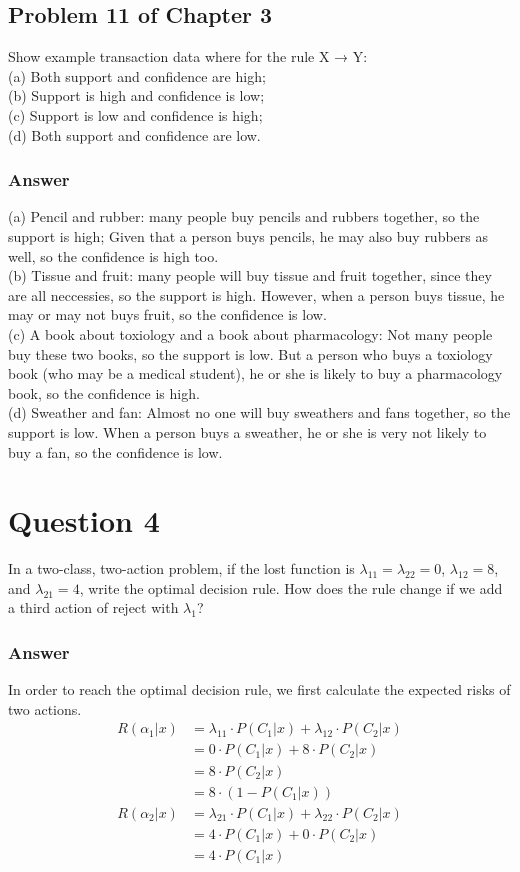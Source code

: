 \documentclass{article}
\begin{document}
\subsection*{Problem 11 of Chapter 3}
Show example transaction data where for the rule X → Y:\\
(a) Both support and confidence are high;\\
(b) Support is high and confidence is low;\\
(c) Support is low and confidence is high;\\ 
(d) Both support and confidence are low.
\subsubsection*{Answer}
(a) Pencil and rubber: many people buy pencils and rubbers together, so the support is high; Given that a person buys pencils, he may also buy rubbers as well, so the confidence is high too.\\
(b) Tissue and fruit: many people will buy tissue and fruit together, since they are all neccessies, so the support is high. However, when a person buys tissue, he may or may not buys fruit, so the confidence is low.\\
(c) A book about toxiology and a book about pharmacology: Not many people buy these two books, so the support is low. But a person who buys a toxiology book (who may be a medical student), he or she is likely to buy a pharmacology book, so the confidence is high. \\
(d) Sweather and fan: Almost no one will buy sweathers and fans together, so the support is low. When a person buys a sweather, he or she is very not likely to buy a fan, so the confidence is low.


\section*{Question 4}
In a two-class, two-action problem, if the lost function is $\lambda_{11}=\lambda_{22}=0$, $\lambda_{12}=8$, and $\lambda_{21}=4$, write 
the optimal decision rule. How does the rule change if we add a third action of reject with $\lambda_1$?
\subsubsection*{Answer}
In order to reach the optimal decision rule, we first calculate the expected risks of two actions.
\begin{align*}
R(\alpha_1|x) &=\lambda_{11}\cdot P(C_1|x) +  \lambda_{12}\cdot P(C_2|x)\\
&=0\cdot P(C_1|x) + 8\cdot P(C_2|x)\\
&= 8\cdot P(C_2|x)\\
&= 8\cdot(1-P(C_1|x))
\end{align*}
\begin{align*}
    R(\alpha_2|x) &=\lambda_{21}\cdot P(C_1|x) +  \lambda_{22}\cdot P(C_2|x)\\
    &=4\cdot P(C_1|x) + 0\cdot P(C_2|x)\\
    &= 4\cdot P(C_1|x)
\end{align*}
\end{document}
